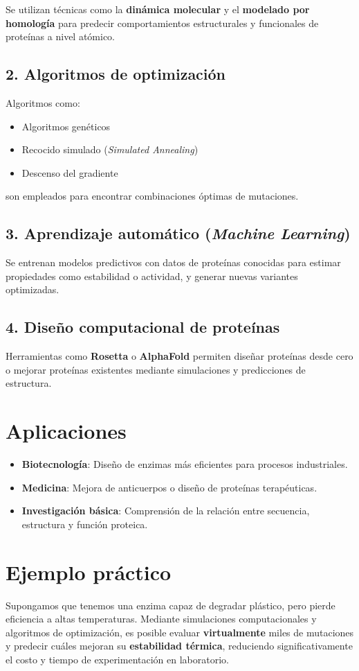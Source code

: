 \documentclass[12pt]{article}
\begin{document}
Se utilizan técnicas como la \textbf{dinámica molecular} y el \textbf{modelado por homología} para predecir comportamientos estructurales y funcionales de proteínas a nivel atómico.

\subsection*{2. Algoritmos de optimización}

Algoritmos como:

\begin{itemize}
    \item Algoritmos genéticos
    \item Recocido simulado (\textit{Simulated Annealing})
    \item Descenso del gradiente
\end{itemize}

son empleados para encontrar combinaciones óptimas de mutaciones.

\subsection*{3. Aprendizaje automático (\textit{Machine Learning})}

Se entrenan modelos predictivos con datos de proteínas conocidas para estimar propiedades como estabilidad o actividad, y generar nuevas variantes optimizadas.

\subsection*{4. Diseño computacional de proteínas}

Herramientas como \textbf{Rosetta} o \textbf{AlphaFold} permiten diseñar proteínas desde cero o mejorar proteínas existentes mediante simulaciones y predicciones de estructura.

\section*{Aplicaciones}

\begin{itemize}
    \item \textbf{Biotecnología}: Diseño de enzimas más eficientes para procesos industriales.
    \item \textbf{Medicina}: Mejora de anticuerpos o diseño de proteínas terapéuticas.
    \item \textbf{Investigación básica}: Comprensión de la relación entre secuencia, estructura y función proteica.
\end{itemize}

\section*{Ejemplo práctico}

Supongamos que tenemos una enzima capaz de degradar plástico, pero pierde eficiencia a altas temperaturas. Mediante simulaciones computacionales y algoritmos de optimización, es posible evaluar \textbf{virtualmente} miles de mutaciones y predecir cuáles mejoran su \textbf{estabilidad térmica}, reduciendo significativamente el costo y tiempo de experimentación en laboratorio.
\end{document}
